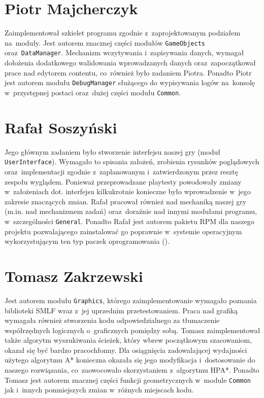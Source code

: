 \documentclass[licencjacka]{pracamgr}
\begin{document}
  \section{Piotr Majcherczyk}
    Zaimplementował szkielet programu zgodnie z~zaprojektowanym podziałem na~moduły. Jest autorem znacznej części modułów \texttt{GameObjects}
    oraz~\texttt{DataManager}. Mechanizm wczytywania i~zapisywania danych, wymagał dołożenia dodatkowego walidowania wprowadzanych danych
    oraz~zapoczątkował prace nad edytorem contentu, co~również było zadaniem Piotra. Ponadto Piotr jest autorem modułu \texttt{DebugManager}
    służącego do wypisywania logów na~konsolę w~przystępnej postaci oraz~dużej części modułu \texttt{Common}.

  \section{Rafał Soszyński}
    Jego głównym zadaniem było stworzenie interfejsu naszej gry (moduł \texttt{UserInterface}). Wymagało to spisania założeń, zrobienia 
    rysunków poglądowych oraz~implementacji zgodnie z~zaplanowanym i~zatwierdzonym przez resztę zespołu wyglądem. Ponieważ przeprowadzane
    playtesty powodowały zmiany w~założeniach dot. interfejsu kilkukrotnie konieczne było wprowadzenie w~jego zakresie znaczących zmian.
    Rafał pracował również nad mechaniką naszej gry (m.in. nad mechanizmem zadań) oraz~doraźnie nad innymi modułami programu, w~szczególności
    \texttt{General}. Ponadto Rafał jest autorem pakietu RPM dla naszego projektu pozwalającego zainstalować go poprawnie w~systemie operacyjnym
    wykorzystującym ten typ paczek oprogramowania ().

  \section{Tomasz Zakrzewski}
    Jest autorem modułu \texttt{Graphics}, którego zaimplementowanie wymagało poznania biblioteki SMLF wraz z~jej uprzednim przetestowaniem.
    Praca nad grafiką wymagała również stworzenia kodu odpowiedzialnego za tłumaczenie współrzędnych logicznych o~graficznych pomiędzy sobą.
    Tomasz zaimplementował także algorytm wyszukiwania ścieżek, który wbrew początkowym szacowaniom, okazał się być bardzo pracochłonny.
    Dla osiągnięcia zadowalającej wydajności użytego algorytmu A* konieczna okazała się jego modyfikacja i~dostosowanie do naszego rozwiązania,
    co~zaowocowało skorzystaniem z~algorytmu HPA*. Ponadto Tomasz jest autorem znacznej części funkcji geometrycznych w~module \texttt{Common}
    jak i~innych pomniejszych zmian w~różnych miejscach kodu.
\end{document}
